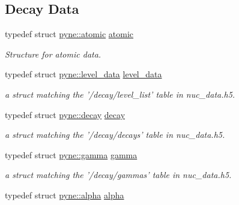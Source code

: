 \subsection*{Decay Data}
\begin{DoxyCompactItemize}
\item 
\hypertarget{namespacepyne_abaa14a5fe8b9e50c101b962f74241928}{typedef struct \hyperlink{structpyne_1_1atomic}{pyne\+::atomic} \hyperlink{namespacepyne_abaa14a5fe8b9e50c101b962f74241928}{atomic}}\label{namespacepyne_abaa14a5fe8b9e50c101b962f74241928}

\begin{DoxyCompactList}\small\item\em Structure for atomic data. \end{DoxyCompactList}\item 
\hypertarget{namespacepyne_a0b3fcf211f0b5f4673867caf0d1750a8}{typedef struct \hyperlink{structpyne_1_1level__data}{pyne\+::level\+\_\+data} \hyperlink{namespacepyne_a0b3fcf211f0b5f4673867caf0d1750a8}{level\+\_\+data}}\label{namespacepyne_a0b3fcf211f0b5f4673867caf0d1750a8}

\begin{DoxyCompactList}\small\item\em a struct matching the '/decay/level\+\_\+list' table in nuc\+\_\+data.\+h5. \end{DoxyCompactList}\item 
\hypertarget{namespacepyne_ad71ccbdf6a5a6d0a42d06226cffca8ff}{typedef struct \hyperlink{structpyne_1_1decay}{pyne\+::decay} \hyperlink{namespacepyne_ad71ccbdf6a5a6d0a42d06226cffca8ff}{decay}}\label{namespacepyne_ad71ccbdf6a5a6d0a42d06226cffca8ff}

\begin{DoxyCompactList}\small\item\em a struct matching the '/decay/decays' table in nuc\+\_\+data.\+h5. \end{DoxyCompactList}\item 
\hypertarget{namespacepyne_a3deec572922f7eedfa646410158a1345}{typedef struct \hyperlink{structpyne_1_1gamma}{pyne\+::gamma} \hyperlink{namespacepyne_a3deec572922f7eedfa646410158a1345}{gamma}}\label{namespacepyne_a3deec572922f7eedfa646410158a1345}

\begin{DoxyCompactList}\small\item\em a struct matching the '/decay/gammas' table in nuc\+\_\+data.\+h5. \end{DoxyCompactList}\item 
\hypertarget{namespacepyne_a3fc79ae6aadb879f43b288c4241ab398}{typedef struct \hyperlink{structpyne_1_1alpha}{pyne\+::alpha} \hyperlink{namespacepyne_a3fc79ae6aadb879f43b288c4241ab398}{alpha}}\label{namespacepyne_a3fc79ae6aadb879f43b288c4241ab398}


\end{DoxyCompactItemize}
